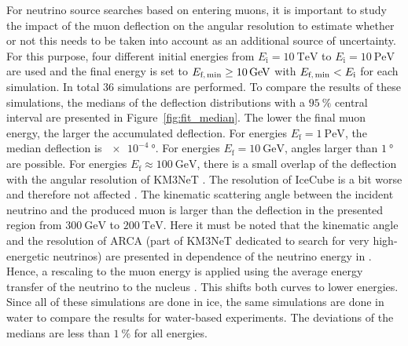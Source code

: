 For neutrino source searches based on entering muons, it is important to study the impact of the muon 
deflection on the angular resolution to estimate whether or not this needs to be 
taken into account as an additional source of uncertainty.
For this purpose, four different initial energies 
from $E_{\text{i}} = \SI{10}{\tera\electronvolt}$ to 
$E_{\text{i}} = \SI{10}{\peta\electronvolt}$ are used and the final 
energy is set to $E_{\text{f,\,min}} \geq \SI{10}{\giga\electronvolt}$ with 
$E_{\text{f,\,min}} < E_{\text{i}}$ for each simulation. 
In total $\num{36}$ simulations are performed. 
To compare the results of these simulations, the medians of the deflection distributions 
with a $\SI{95}{\percent}$ central interval are presented in 
Figure~\ref{fig:fit_median}.
The lower the final muon energy, the larger the accumulated deflection. 
For energies $E_{\text{f}} = \SI{1}{\peta\electronvolt}$, the median deflection 
is $\SI{e-4}{\degree}$. For energies $E_{\text{f}} = \SI{10}{\giga\electronvolt}$, 
angles larger than $\SI{1}{\degree}$ are possible. For energies  
$E_{\text{f}} \approx \SI{100}{\giga\electronvolt}$, 
there is a small overlap of the deflection with the angular resolution of KM3NeT 
\cite{KM3NeT_Resolution2016, KM3NeT_Resolution2021}. The resolution of IceCube is a bit worse and 
therefore not affected \cite{IceCube_Resolution2021}. 
The kinematic scattering angle between the incident neutrino and the produced muon is 
larger than the deflection in the presented region from $\SI{300}{\giga\electronvolt}$
to $\SI{200}{\tera\electronvolt}$. Here it must be noted that the kinematic angle 
and the resolution of ARCA (part of KM3NeT dedicated to search for very high-energetic neutrinos) are presented in dependence of the neutrino energy 
in \cite{KM3NeT_Resolution2016, KM3NeT_Resolution2021}. Hence, a rescaling to the muon energy is applied using the average energy transfer of the neutrino to 
the nucleus \cite{GANDHI199681}. This shifts both curves to lower energies. 
Since all of these simulations are done 
in ice, the same simulations are done in water to compare the results for 
water-based experiments. The deviations of the medians
are less than $\SI{1}{\percent}$ for all energies.

